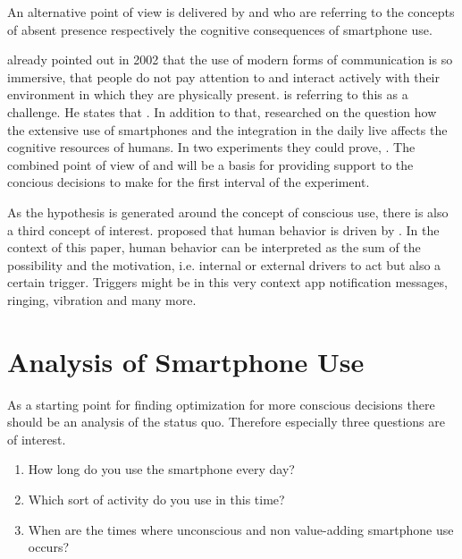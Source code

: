 \documentclass[11pt,letterpaper]{article}
\begin{document}
An alternative point of view is delivered by \cite{Gergen.2002} and \cite{Ward.2017} who are referring to the concepts of absent presence respectively the cognitive consequences of smartphone use.
\begin{center}
 \autocite[][p.227]{Gergen.2002}
\end{center}
\cite{Gergen.2002} already pointed out in 2002 that the use of modern forms of communication is so immersive, that people do not pay attention to and interact actively with their environment in which they are physically present. \cite{Gergen.2002} is referring to this as a challenge. He states that \autocite[][p.236]{Gergen.2002}. In addition to that, \cite{Ward.2017} researched on the question how the extensive use of smartphones and the integration in the daily live affects the cognitive resources of humans. In two experiments they could prove,  \autocite[][]{Ward.2017}. The combined point of view of \cite{Gergen.2002} and \cite{Ward.2017} will be a basis for providing support to the concious decisions to make for the first interval of the experiment.

As the hypothesis is generated around the concept of conscious use, there is also a third concept of interest. \cite{Fogg.2015} proposed  \autocite{Fogg.2015} that human behavior is driven by  \autocite{Fogg.2015}. In the context of this paper, human behavior can be interpreted as the sum of the possibility and the motivation, i.e. internal or external drivers to act but also a certain trigger. Triggers might be in this very context app notification messages, ringing, vibration and many more. 


\section*{Analysis of Smartphone Use}
As a starting point for finding optimization for more conscious decisions there should be an analysis of the status quo. Therefore especially three questions are of interest. 
\begin{enumerate}
\item How long do you use the smartphone every day?
\item Which sort of activity do you use in this time?
\item When are the times where unconscious and non value-adding smartphone use occurs?
\end{enumerate}
\end{document}
